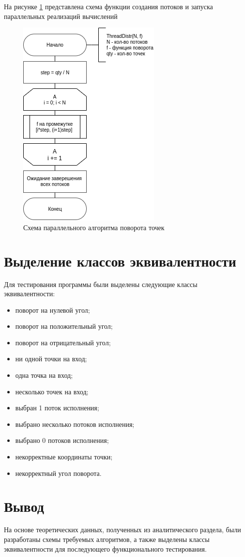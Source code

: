 На рисунке \ref{scheme:threaddistr} представлена схема функции создания потоков и
запуска параллельных реализаций вычислений
\begin{figure}[!htb]
	\centering
	\includegraphics[scale=0.58]{schemes/threaddistr}
	\caption{Схема параллельного алгоритма поворота точек}
	\label{scheme:threaddistr}
\end{figure}


\section{Выделение классов эквивалентности}

Для тестирования программы были выделены следующие классы эквивалентности:
\begin{itemize}
    \item поворот на нулевой угол;
    \item поворот на положительный угол;
    \item поворот на отрицательный угол;
    \item ни одной точки на вход;
    \item одна точка на вход;
    \item несколько точек на вход;
    \item выбран 1 поток исполнения;
    \item выбрано несколько потоков исполнения;
    \item выбрано 0 потоков исполнения;
    \item некорректные координаты точки;
    \item некорректный угол поворота.
\end{itemize}

\section{Вывод}
На основе теоретических данных, полученных из аналитического
раздела, были разработаны схемы требуемых алгоритмов, а также выделены классы
эквивалентности для последующего функционального тестирования.

